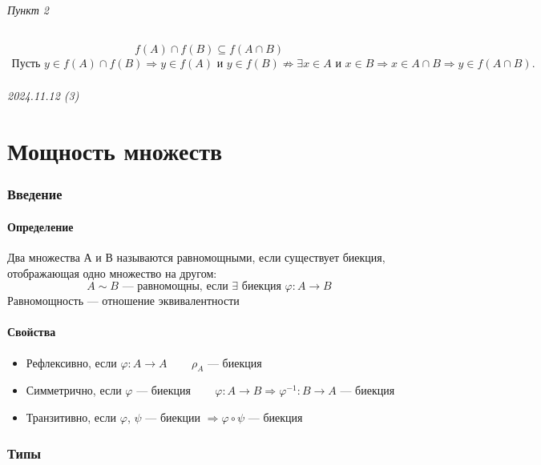 \documentclass{article}
\begin{document}
\paragraph{Пункт 2}
\[
    f(A) \cap f(B) \subseteq f(A \cap B)
\]
\begin{gather*}
    \text{Пусть } y \in f(A) \cap f(B) \Rightarrow
    y \in f(A) \text{ и } y \in f(B) \nRightarrow
    \exists x \in A \text{ и } x \in B \Rightarrow
    x \in A \cap B \Rightarrow y \in f(A \cap B).
\end{gather*}




\newpage
\paragraph{2024.11.12 (3)}
\part{Мощность множеств}

\section{Введение}

\subsection{Определение}
Два множества А и В называются равномощными, если существует биекция, отображающая одно множество на другом:
\[
    A \sim B \text{ --- равномощны, если } \exists \text{ биекция } \varphi: A \rightarrow B 
\]
Равномощность --- отношение эквивалентности

\subsection{Свойства}
\begin{itemize}
    \item Рефлексивно, если $\varphi: A \rightarrow A$ ~~~ $\rho_A$ --- биекция 
    \item Симметрично, если $\varphi$ --- биекция ~~~ $\varphi: A \rightarrow B \Rightarrow \varphi^{-1}: B \rightarrow A$ --- биекция
    \item Транзитивно, если $\varphi$, $\psi$ --- биекции $\Rightarrow \varphi \circ \psi$ --- биекция
\end{itemize}



\section{Типы}
\end{document}
